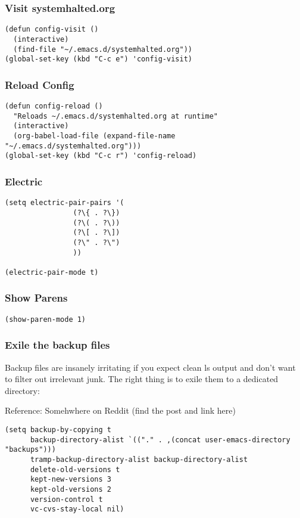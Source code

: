 \documentclass[11pt]{article}
\begin{document}
\subsubsection{Visit systemhalted.org}
\label{sec:orgf1dd075}
\begin{verbatim}
(defun config-visit ()
  (interactive)
  (find-file "~/.emacs.d/systemhalted.org"))
(global-set-key (kbd "C-c e") 'config-visit)
\end{verbatim}
\subsubsection{Reload Config}
\label{sec:org3dfbacb}
\begin{verbatim}
(defun config-reload ()
  "Reloads ~/.emacs.d/systemhalted.org at runtime"
  (interactive)
  (org-babel-load-file (expand-file-name "~/.emacs.d/systemhalted.org")))
(global-set-key (kbd "C-c r") 'config-reload)
\end{verbatim}

\subsubsection{Electric}
\label{sec:orge95a40d}

\begin{verbatim}
(setq electric-pair-pairs '(
			    (?\{ . ?\})
			    (?\( . ?\))
			    (?\[ . ?\])
			    (?\" . ?\")
			    ))

(electric-pair-mode t)
\end{verbatim}
\subsubsection{Show  Parens}
\label{sec:orgf342207}

\begin{verbatim}
(show-paren-mode 1)
\end{verbatim}

\subsubsection{Exile the backup files}
\label{sec:org2f5c2c4}

Backup files are insanely irritating if you expect clean ls output and don't want to filter out irrelevant junk. The right thing is to exile them to a dedicated directory:

Reference: Somehwhere on Reddit (find the post and link here)

\begin{verbatim}
(setq backup-by-copying t
      backup-directory-alist `(("." . ,(concat user-emacs-directory "backups")))
      tramp-backup-directory-alist backup-directory-alist
      delete-old-versions t
      kept-new-versions 3
      kept-old-versions 2
      version-control t
      vc-cvs-stay-local nil)
\end{verbatim}
\end{document}
